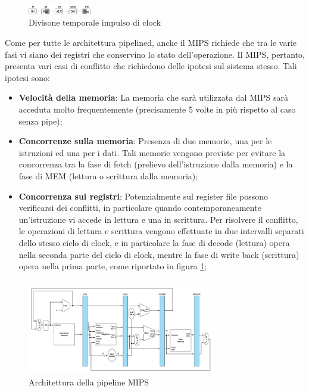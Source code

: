 \begin{figure}[!ht]
    \centering
    \includegraphics[width=0.25\textwidth]{img/MIPS_clock_split.png}
    \caption{Divisone temporale impulso di clock}
    \label{img:MIPS_divisione_clock}
\end{figure}

Come per tutte le architettura pipelined, anche il MIPS richiede che tra le varie fasi vi siano dei registri che conservino lo stato dell'operazione.
Il MIPS, pertanto, presenta vari casi di conflitto che richiedono delle ipotesi sul sistema stesso. Tali ipotesi sono:

\begin{itemize}
    \item \textbf{Velocità della memoria}: La memoria che sarà utilizzata dal MIPS sarà acceduta molto frequentemente (precisamente 5 volte in più rispetto al caso senza pipe);
    \item \textbf{Concorrenze sulla memoria}: Presenza di due memorie, una per le istruzioni ed una per i dati. Tali memorie vengono previste per evitare la concorrenza tra la fase di fetch (prelievo dell'istruzione dalla memoria) e la fase di MEM (lettura o scrittura dalla memoria);
    \item \textbf{Concorrenza sui registri}: Potenzialmente sul register file possono verificarsi dei conflitti, in particolare quando contemporaneamente un'istruzione vi accede in lettura e una in scrittura. Per risolvere il conflitto, le operazioni di lettura e scrittura vengono effettuate in due intervalli separati dello stesso ciclo di clock, e in particolare la fase di decode (lettura) opera nella seconda parte del ciclo di clock, mentre la fase di write back (scrittura) opera nella prima parte, come riportato in figura \ref{img:MIPS_divisione_clock};
\end{itemize}

\begin{figure}[!ht]
    \centering
    \includegraphics[width=0.75\textwidth]{img/MIPS_architettura_pipeline.png}
    \caption{Architettura della pipeline MIPS}
    \label{img:MIPS_architettura_pipeline}
\end{figure}

